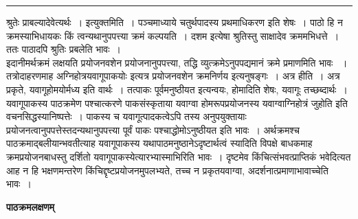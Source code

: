 \documentclass[11pt, openany]{book}
\newcommand\alfootnote[1]{%
  \begingroup
  \renewcommand\thefootnoteA{}\footnoteA{#1}%
  \addtocounter{footnoteA}{-1}%
  \endgroup
}
\begin{document}
\hrule
\vspace{3mm}
\noindent
श्रुतेः प्राबल्यादेवेत्यर्थः~। {\br इत्युक्तमिति~।} पञ्चमाध्याये चतुर्थपादस्य प्रथमाधिकरण इति शेषः~। पाठो हि न क्रमस्याभिधायकः किं त्वन्यथानुपपत्त्या क्रमं कल्पयति~। दशम इत्येषा श्रुतिस्तु साक्षादेव क्रममभिधत्ते~। ततः पाठादपि श्रुतिः प्रबलेति भावः~।\\

 इदानीमर्थक्रमं लक्षयति प्रयोजनवशेन प्रयोजनानुपपत्त्या, तद्धि व्युत्क्रमेऽनुपपद्यमानं क्रमे प्रमाणमिति भावः~ । तत्रोदाहरणमाह {\qt अग्निहोत्रयवागूपाकयोः} इत्यत्र प्रयोजनवशेन क्रमनिर्णय इत्यनुषङ्गः~। {\br अत्र हीति~।} अत्र प्रकृते,
यवागूहोमयोर्मध्य इति वार्थः~। तत्पाकः पूर्वमनुष्ठीयत इत्यन्वयः, होमादिति शेषः, यवागूः तच्छब्दार्थः~। यवागूपाकस्य पाठक्रमेण पश्चात्करणे पाकसंस्कृताया यवाग्वा होमरूपप्रयोजनस्य {\qt यवाग्वाग्निहोत्रं जुहोति} इति वचनसिद्धस्यानिष्पत्तेः~। पाकस्य च यवागूत्पादकत्वेऽपि तस्य अनुपयुक्तायाः प्रयोजनत्वानुपपत्तेस्तदन्यथानुपपत्त्या पूर्वं पाकः पश्चाद्धोमोऽनुष्ठीयत इति भावः~। अर्थक्रमश्च पाठक्रमाद्बलीयान्भवतीत्याह यवागूपाकस्य यथापाठमनुष्ठानेऽदृष्टार्थत्वं स्यादिति विपक्षे
बाधकमाह \footnotemarkA[1]क्रमप्रयोजनबाधस्तु दर्शितो यवागूपाकस्येत्यारभ्यास्माभिरिति भावः~। दृष्टमेव किंचित्संभवत्प्राप्तिकं
भवेदित्यत आह न हि भक्षणमन्तरेण किंचिद्दृष्टप्रयोजनमुपलभ्यते, तच्च न प्रकृतयवाग्वा, अदर्शनात्प्रमाणाभावाच्चेति भावः~।
\alfootnote{टिप्प०\textemdash\ $^{1}$पाठक्रमेत्यर्थः~।}
\newpage
\begin{center}
\textbf{पाठक्रमलक्षणम्}    
\end{center}
\end{document}
